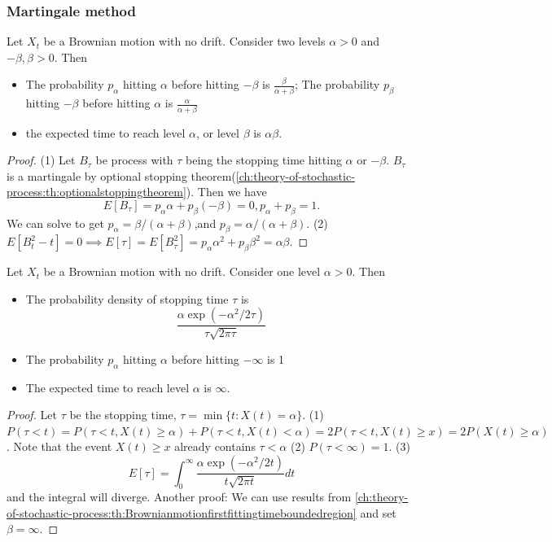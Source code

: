 \begin{refsection}
\subsubsection{Martingale method}
\begin{lemma}\label{ch:theory-of-stochastic-process:th:Brownianmotionfirstfittingtimeboundedregion}
	Let $X_t$  be a Brownian motion with no drift. Consider two levels $\alpha > 0$ and  $ - \beta, \beta > 0$. Then 
	\begin{itemize}
		\item The probability $p_\alpha$ hitting $\alpha$ before hitting $-\beta$ is $\frac{\beta}{\alpha+\beta}$;  The probability $p_\beta$ hitting $-\beta$ before hitting $\alpha$ is $\frac{\alpha}{\alpha+\beta}$
		\item the expected time to reach level $\alpha$, or level $\beta$ is $\alpha\beta$. 
	\end{itemize}
\end{lemma}
\begin{proof}
	(1) Let $B_\tau$ be process with $\tau$ being the stopping time hitting $\alpha$ or $-\beta$. $B_\tau$ is a martingale by optional stopping theorem(\autoref{ch:theory-of-stochastic-process:th:optionalstoppingtheorem}). Then we have
	$$E[B_\tau] = p_\alpha \alpha + p_\beta (-\beta) = 0, p_\alpha + p_\beta = 1.$$
	We can solve to get $p_{\alpha} = \beta/(\alpha + \beta)$,and $p_{\beta} = \alpha/(\alpha + \beta)$.
	(2) $E[B_t^2 - t] = 0 \implies E[\tau] = E[B_\tau^2] = p_\alpha \alpha^2 + p_\beta \beta^2 = \alpha\beta.$
\end{proof}

\begin{lemma}\cite[112]{shreve2004stochastic2}\label{ch:theory-of-stochastic-process:th:Brownianmotionfirstfittingtimesinglelevel}
	Let $X_t$  be a Brownian motion with no drift. Consider one level $\alpha > 0$. Then 
	\begin{itemize}
		\item The probability density of stopping time $\tau$ is $$\frac{\alpha \exp(-\alpha^2/2\tau)}{\tau\sqrt{2\pi \tau}}$$ 
		\item The probability $p_\alpha$ hitting $\alpha$ before hitting $-\infty$ is 1
		\item The expected time to reach level $\alpha$ is $\infty$.
	\end{itemize}
\end{lemma}
\begin{proof}
	Let $\tau$ be the stopping time, $\tau = \min\{t:X(t) = \alpha\}$.
	(1) $P(\tau < t) = P(\tau <t, X(t) \geq \alpha) + P(\tau <t, X(t) < \alpha) = 2P(\tau < t, X(t) \geq x) = 2P(X(t) \geq \alpha)$. 
	Note that the event $X(t) \geq x$ already contains $\tau < \alpha$
	(2) $P(\tau < \infty) = 1$.
	(3) $$E[\tau] = \int_0^\infty \frac{\alpha \exp(-\alpha^2/2t)}{t\sqrt{2\pi t}}dt $$
	and the integral will diverge.
	Another proof: 
	We can use results from \autoref{ch:theory-of-stochastic-process:th:Brownianmotionfirstfittingtimeboundedregion} and set $\beta = \infty$.
\end{proof}




\end{refsection}
